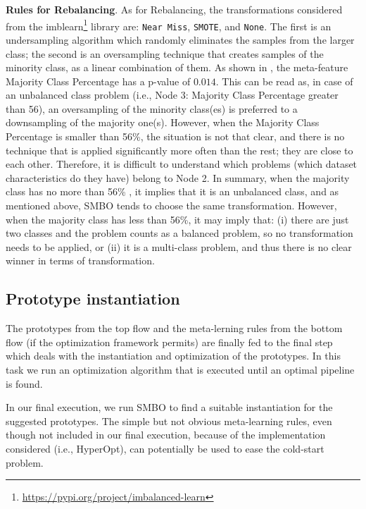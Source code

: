 \begin{example}
\textbf{Rules for Rebalancing}. As for Rebalancing, the transformations considered from the imblearn\footnote{\url{https://pypi.org/project/imbalanced-learn}} library are: \texttt{Near Miss}, \texttt{SMOTE}, and \texttt{None}.
The first is an undersampling algorithm which randomly eliminates the samples from the larger class; the second is an oversampling technique that creates samples of the minority class, as a linear combination of them.
As shown in , the meta-feature Majority Class Percentage has a p-value of $0.014$.
This can be read as, in case of an unbalanced class problem (i.e., Node 3: Majority Class Percentage greater than 56), an oversampling of the minority class(es) is preferred to a downsampling of the majority one(s).
However, when the Majority Class Percentage is smaller than 56\%, the situation is not that clear, and there is no technique that is applied significantly more often than the rest; they are close to each other.
Therefore, it is difficult to understand which problems (which dataset characteristics do they have) belong to Node 2.
In summary, when the majority class has no more than 56\% , it implies that it is an unbalanced class, and as mentioned above, SMBO tends to choose the same transformation.
However, when the majority class has less than 56\%, it may imply that: (i) there are just two classes and the problem counts as a balanced problem, so no transformation needs to be applied, or (ii) it is a multi-class problem, and thus there is no clear winner in terms of transformation.
\end{example}

\subsection{Prototype instantiation}
\label{effective-ssec:prototype-insta}

The prototypes from the top flow and the meta-lerning rules from the bottom flow (if the optimization framework permits) are finally fed to the final step which deals with the instantiation and optimization of the prototypes. In this task we run an optimization algorithm that is executed until an optimal pipeline is found.

\begin{example}
 In our final execution, we run SMBO to find a suitable instantiation for the suggested prototypes. The simple but not obvious meta-learning rules, even though not included in our final execution, because of the implementation considered (i.e., HyperOpt), can potentially be used to ease the cold-start problem.
\end{example}

